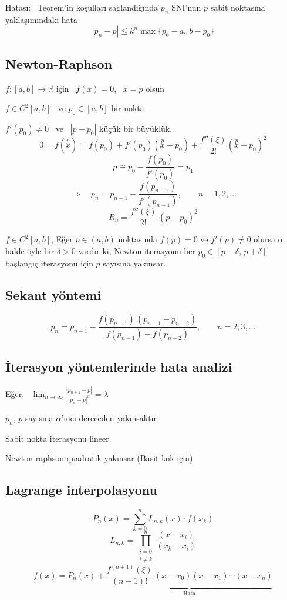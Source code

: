 \documentclass[11pt,a4paper]{article}
\begin{document}
\textcolor{kirmizikalem}{Hatası:} \ Teorem'in koşulları sağlandığında $p_n$ SNI'nun $p$ sabit noktasına
yaklaşımındaki hata
\[ |p_n - p| \le k^n \max\{p_0 - a,\ b - p_0\} \]

\subsection{Newton-Raphson}
$f : [a,b] \rightarrow \mathbb{R}$ için \ $f(x) = 0$, \ $x = p$ olsun

$f \in C^2[a,b]$ \ ve $p_0 \in [a,b]$ bir nokta

$f'(p_0) \neq 0$ \ ve \ $|p - p_0|$ küçük bir büyüklük.
\[
  0 = f(\overset{p}{x}) = f(p_0) + f'(p_0)(\overset{p}{x} - p_0)
      + \frac{f''(\xi)}{2!}(\overset{p}{x} - p_0)^2
\]
\[ p \cong p_0 - \frac{f(p_0)}{f'(p_0)} = p_1 \]
\[ \Rightarrow \quad p_n = p_{n-1} - \frac{f(p_{n-1})}{f'(p_{n-1})}, \qquad n = 1, 2, \dots \]
\[ R_n = \frac{f''(\xi)}{2!}\,(p - p_0)^2 \]

\begin{teorem}
  $f \in C^2[a,b]$, Eğer $p \in (a,b)$ noktasında $f(p) = 0$ ve $f'(p) \neq 0$ olursa o halde öyle
  bir $\delta > 0$ vardır ki, Newton iterasyonu her $p_0 \in [p - \delta,\, p + \delta]$ başlangıç
  iterasyonu için $p$ sayısına yakınsar.
\end{teorem}

\subsection{Sekant yöntemi}
\[
  p_n = p_{n-1} - \frac{f(p_{n-1})\,(p_{n-1} - p_{n-2})}{f(p_{n-1}) - f(p_{n-2})},
  \qquad n = 2, 3, \dots
\]

\subsection{İterasyon yöntemlerinde hata analizi}
Eğer; \ $\displaystyle \lim_{n \to \infty} \frac{|p_{n+1} - p|}{|p_n - p|^{\alpha}} = \lambda$

$p_n$, $p$ sayısına $\alpha$'ıncı dereceden yakınsaktır

Sabit nokta iterasyonu lineer

Newton-raphson quadratik yakınsar (Basit kök için)

\subsection{Lagrange interpolasyonu}
\[ P_n(x) = \sum_{k=0}^{n} L_{n,k}(x) \cdot f(x_k) \]
\[ L_{n,k} = \prod_{\substack{i=0 \\ i \neq k}}^{n} \frac{(x - x_i)}{(x_k - x_i)} \]
\[
  f(x) = P_n(x) + \underbrace{\frac{f^{(n+1)}(\xi)}{(n+1)!}\,(x - x_0)(x - x_1)\cdots(x - x_n)}_{\text{Hata}}
\]
\end{document}
